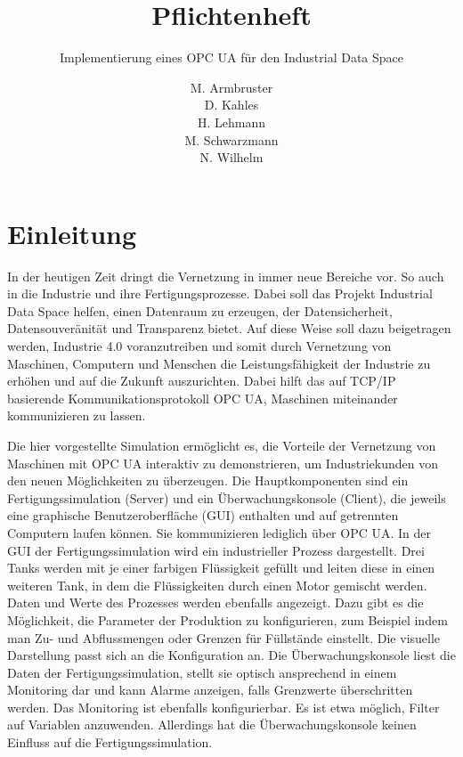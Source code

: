 \documentclass[parskip=full]{scrartcl}
\title{Pflichtenheft}
\subtitle{Implementierung eines OPC UA \glslink{Systemadapter}{Systemadapters} für den \gls{Industrial Data Space}}
\author{
    M. Armbruster\\
    D. Kahles\\
    H. Lehmann\\
    M. Schwarzmann\\
    N. Wilhelm
}
\begin{document}
\maketitle
\pagebreak
\tableofcontents
\pagebreak

\section{Einleitung}
In der heutigen Zeit dringt die Vernetzung in immer neue Bereiche vor. So auch in die Industrie und ihre Fertigungsprozesse.
Dabei soll das Projekt Industrial Data Space helfen, einen Datenraum zu erzeugen, der Datensicherheit, Datensouveränität und
Transparenz bietet. Auf diese Weise soll dazu beigetragen werden, Industrie 4.0 voranzutreiben und somit durch Vernetzung von
Maschinen, Computern und Menschen die Leistungsfähigkeit der Industrie zu erhöhen und auf die Zukunft auszurichten.
Dabei hilft das auf TCP/IP basierende Kommunikationsprotokoll OPC UA, Maschinen miteinander kommunizieren zu lassen.

Die hier vorgestellte Simulation ermöglicht es, die Vorteile der Vernetzung von Maschinen mit OPC UA interaktiv zu demonstrieren, um Industriekunden von den neuen Möglichkeiten zu überzeugen.
Die Hauptkomponenten sind ein Fertigungssimulation (Server) und ein Überwachungskonsole (Client),
die jeweils eine graphische Benutzeroberfläche (GUI) enthalten und auf getrennten Computern laufen können.
Sie kommunizieren lediglich über OPC UA.
In der GUI der Fertigungssimulation wird ein industrieller Prozess dargestellt.
Drei Tanks werden mit je einer farbigen Flüssigkeit gefüllt und leiten diese in einen weiteren Tank,
in dem die Flüssigkeiten durch einen Motor gemischt werden. Daten und Werte des Prozesses werden ebenfalls angezeigt. Dazu gibt es
die Möglichkeit, die Parameter der Produktion zu konfigurieren,  zum Beispiel indem man Zu- und Abflussmengen oder Grenzen für Füllstände einstellt. Die visuelle Darstellung passt sich an die Konfiguration an.
Die Überwachungskonsole liest die Daten der Fertigungssimulation, stellt sie optisch ansprechend in einem Monitoring dar
und kann Alarme anzeigen, falls Grenzwerte überschritten werden. Das Monitoring ist ebenfalls konfigurierbar. Es ist etwa möglich, Filter auf Variablen anzuwenden. Allerdings hat die Überwachungskonsole keinen Einfluss auf die Fertigungssimulation.

\pagebreak
\end{document}
